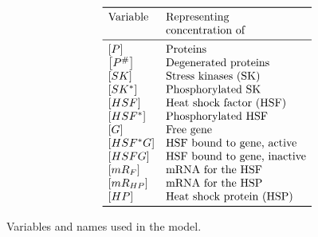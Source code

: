 \documentclass[oneside, 10pt, a4paper, twocolumn]{article}
\begin{document}
%

\begin{table}[h!]
\[\begin{array}{ll}
\toprule
  \text{Variable} & \text{Representing } \\
                  & \text{concentration of} \\
\midrule
 \left[P\right]       & \text{Proteins} \\
 \left[P^\#\right]    & \text{Degenerated proteins} \\
 \left[SK\right]      & \text{Stress kinases (SK)} \\ 
 \left[SK^*\right]    & \text{Phosphorylated SK} \\ 
 \left[HSF\right]     & \text{Heat shock factor (HSF)} \\  
 \left[HSF^*\right]   & \text{Phosphorylated HSF} \\
 \left[G\right]       & \text{Free gene} \\
 \left[HSF^*G\right]  & \text{HSF bound to gene, active} \\
 \left[HSFG\right]    & \text{HSF bound to gene, inactive} \\
 \left[mR_F\right]    & \text{mRNA for the HSF} \\
 \left[mR_{HP}\right] & \text{mRNA for the HSP} \\
 \left[HP\right]      & \text{Heat shock protein (HSP)} \\
\bottomrule
\end{array}\]
\caption{Variables and names used in the model.}\label{TabVars}
\end{table}
\end{document}
